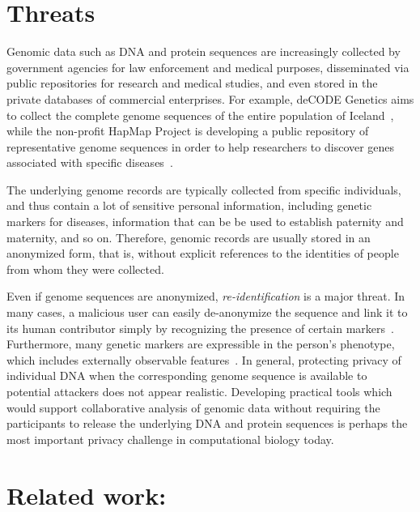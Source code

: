 \section{Threats}
Genomic data such as DNA and protein sequences are increasingly collected
by government agencies for law enforcement and medical purposes,
disseminated via public repositories for research and medical studies,
and even stored in the private databases of commercial enterprises.
For example, deCODE Genetics aims to collect the complete genome sequences
of the entire population of Iceland~\cite{decode}, while the non-profit
HapMap Project is developing a public repository of representative genome
sequences in order to help researchers to discover genes associated with
specific diseases~\cite{hapmap}.

The underlying genome records are typically collected from specific
individuals, and thus contain a lot of sensitive personal information,
including genetic markers for diseases, information that can be be used to
establish paternity and maternity, and so on.  Therefore, genomic records
are usually stored in an anonymized form, that is, without explicit
references to the identities of people from whom they were collected.

Even if genome sequences are anonymized, \emph{re-identification} is a
major threat.  In many cases, a malicious user can easily de-anonymize
the sequence and link it to its human contributor simply by recognizing
the presence of certain markers~\cite{cmugenome}.  Furthermore,
many genetic markers are expressible in the person's phenotype, which
includes externally observable features~\cite{harvard}.  In general,
protecting privacy of individual DNA when the corresponding genome
sequence is available to potential attackers does not appear realistic.
Developing practical tools which would support collaborative analysis of
genomic data without requiring the participants to release the underlying
DNA and protein sequences is perhaps the most important privacy challenge
in computational biology today.

\section{Related work:} 

